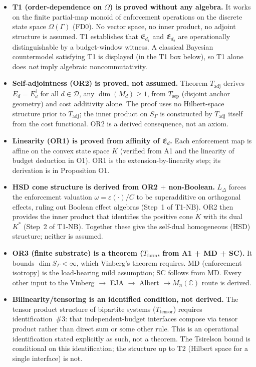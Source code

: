 \documentclass[11pt]{article}
\theoremstyle{remark}
\begin{document}
\begin{itemize}[nosep,leftmargin=2em,itemsep=3pt]
\item \textbf{T1 (order-dependence on $\Omega$) is proved without any algebra.}  It works on the finite partial-map monoid of enforcement operations on the discrete state space $\Omega(\Gamma)$ (FD0).  No vector space, no inner product, no adjoint structure is assumed.  T1 establishes that $\mathfrak{E}_{d_1}$ and $\mathfrak{E}_{d_2}$ are operationally distinguishable by a budget-window witness.  A classical Bayesian countermodel satisfying T1 is displayed (in the T1 box below), so T1 alone does \emph{not} imply algebraic noncommutativity.

\item \textbf{Self-adjointness (OR2) is proved, not assumed.}  Theorem $T_{\mathrm{adj}}$ derives $E_d = E_d^\dagger$ for all $d \in \mathcal{D}$, any $\dim(M_d) \ge 1$, from $T_{\mathrm{sep}}$ (disjoint anchor geometry) and cost additivity alone.  The proof uses no Hilbert-space structure prior to $T_{\mathrm{adj}}$; the inner product on $S_\Gamma$ is constructed by $T_{\mathrm{adj}}$ itself from the cost functional.  OR2 is a derived consequence, not an axiom.

\item \textbf{Linearity (OR1) is proved from affinity of $\mathfrak{E}_d$.}  Each enforcement map is affine on the convex state space $K$ (verified from A1 and the linearity of budget deduction in O1).  OR1 is the extension-by-linearity step; its derivation is in Proposition O1.

\item \textbf{HSD cone structure is derived from OR2 $+$ non-Boolean.}  $L_\Delta$ forces the enforcement valuation $\omega = \varepsilon(\cdot)/C$ to be superadditive on orthogonal effects, ruling out Boolean effect algebras (Step~1 of T1-NB).  OR2 then provides the inner product that identifies the positive cone $K$ with its dual $K^*$ (Step~2 of T1-NB).  Together these give the self-dual homogeneous (HSD) structure; neither is assumed.

\item \textbf{OR3 (finite substrate) is a theorem ($T_{\mathrm{form}}$, from A1 + MD + SC).}  It bounds $\dim S_\Gamma < \infty$, which Vinberg's theorem requires.  MD (enforcement isotropy) is the load-bearing mild assumption; SC follows from MD.  Every other input to the Vinberg $\to$ EJA $\to$ Albert $\to M_n(\mathbb{C})$ route is derived.

\item \textbf{Bilinearity/tensoring is an identified condition, not derived.}  The tensor product structure of bipartite systems ($T_{\mathrm{tensor}}$) requires identification~\#3: that independent-budget interfaces compose via tensor product rather than direct sum or some other rule.  This is an operational identification stated explicitly as such, not a theorem.  The Tsirelson bound is conditional on this identification; the structure up to T2 (Hilbert space for a single interface) is not.


\end{itemize}
\end{document}
